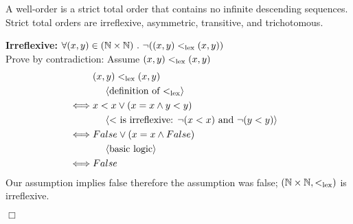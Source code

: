\documentclass[11pt,fleqn]{article}
\newcommand{\sglsp}{\ }
\newenvironment{proof}{\par\noindent{\bf Proof\sglsp}}{\hfill$\Box$}
\newcommand{\pnote}[1]{{\langle \text{#1} \rangle}}
\begin{document}
\begin{proof}
	A well-order is a strict total order that contains no infinite descending sequences. 
	Strict total orders are irreflexive, asymmetric, transitive, and trichotomous. 
	
	\textbf{Irreflexive:} $\forall (x,y) \in (\mathbb{N} \times \mathbb{N}) ~.~ \neg{((x,y) <_{\rm lex} (x,y))}$\\
	Prove by contradiction: Assume $(x,y) <_{\rm lex} (x,y)$\\
	\begin{align*}
		& (x,y) <_{\rm lex} (x,y) & \\
		& ~~~~\pnote{definition of $<_{\rm lex}$}&\\
		\iff & x<x \vee (x=x \wedge y<y) & \\
		& ~~~~\pnote{$<$ is irreflexive: $\neg{(x<x)}$ and $\neg{(y<y)}$}&\\
		\iff & False \vee (x=x \wedge False) & \\
		& ~~~~\pnote{basic logic} & \\
		\iff & False & 
	\end{align*}
	Our assumption implies false therefore the assumption was false; $(\mathbb{N} \times \mathbb{N},<_{\rm lex})$ is irreflexive.
	\medskip
	

\end{proof}
\end{document}
